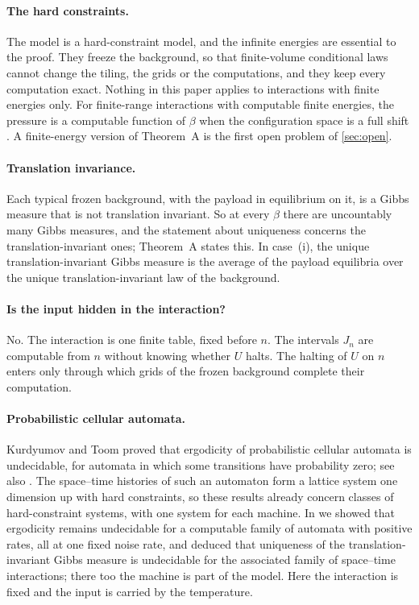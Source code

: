 \paragraph{The hard constraints.} The model is a hard-constraint model, and the infinite energies are essential to the proof. They freeze the background, so that finite-volume conditional laws cannot change the tiling, the grids or the computations, and they keep every computation exact. Nothing in this paper applies to interactions with finite energies only. For finite-range interactions with computable finite energies, the pressure is a computable function of $\beta$ when the configuration space is a full shift \cite[Proposition~14]{GST25}. A finite-energy version of Theorem~A is the first open problem of \cref{sec:open}.

\paragraph{Translation invariance.} Each typical frozen background, with the payload in equilibrium on it, is a Gibbs measure that is not translation invariant. So at every $\beta$ there are uncountably many Gibbs measures, and the statement about uniqueness concerns the translation-invariant ones; Theorem~A states this. In case~(i), the unique translation-invariant Gibbs measure is the average of the payload equilibria over the unique translation-invariant law of the background.

\paragraph{Is the input hidden in the interaction?} No. The interaction is one finite table, fixed before $n$. The intervals $J_n$ are computable from $n$ without knowing whether $U$ halts. The halting of $U$ on $n$ enters only through which grids of the frozen background complete their computation.

\paragraph{Probabilistic cellular automata.} Kurdyumov \cite{Kurdyumov78} and Toom \cite{Toom00} proved that ergodicity of probabilistic cellular automata is undecidable, for automata in which some transitions have probability zero; see also \cite{BMM13}. The space--time histories of such an automaton form a lattice system one dimension up with hard constraints, so these results already concern classes of hard-constraint systems, with one system for each machine. In \cite{DM26forget} we showed that ergodicity remains undecidable for a computable family of automata with positive rates, all at one fixed noise rate, and deduced that uniqueness of the translation-invariant Gibbs measure is undecidable for the associated family of space--time interactions; there too the machine is part of the model. Here the interaction is fixed and the input is carried by the temperature.


